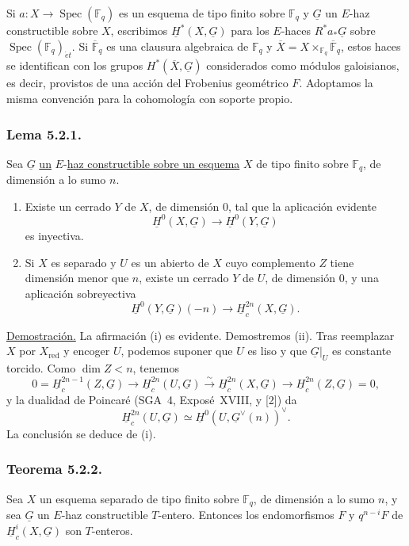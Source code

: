 \pageoriginale

Si $a:X\longrightarrow\operatorname{Spec}(\mathbb F_q)$ es un esquema
de tipo finito sobre $\mathbb F_q$ y $\underline G$ un $E$-haz
constructible sobre $X$, escribimos $\underline H^*(X,\underline G)$ para
los $E$-haces $R^*a_*\underline G$ sobre
$\operatorname{Spec}(\mathbb F_q)_{\acute e t}$. Si
$\overline{\mathbb F}_q$ es una clausura algebraica de $\mathbb F_q$ y
$\overline X=X\times_{\mathbb F_q}\overline{\mathbb F}_q$, estos haces se
identifican con los grupos $H^*(\overline X,\underline G)$ considerados
como módulos galoisianos, es decir, provistos de una acción del Frobenius
geométrico $F$. Adoptamos la misma convención para la cohomología con
soporte propio.

\subsubsection*{Lema 5.2.1.}
Sea $\underline G$ \underline{un} $E$-\underline{haz constructible sobre un esquema} $X$ de tipo
finito sobre $\mathbb F_q$, de dimensión a lo sumo $n$.
\begin{enumerate}[label=(\roman*)]
\item Existe un cerrado $Y$ de $X$, de dimensión $0$, tal que la
  aplicación evidente
  \[
  \underline H^0(X,\underline G)\longrightarrow
  \underline H^0(Y,\underline G)
  \]
  es inyectiva.
\item Si $X$ es separado y $U$ es un abierto de $X$ cuyo complemento $Z$
  tiene dimensión menor que $n$, existe un cerrado $Y$ de $U$, de
  dimensión $0$, y una aplicación sobreyectiva
  \[
  \underline H^0(Y,\underline G)(-n)\longrightarrow
  \underline H_c^{2n}(X,\underline G).
  \]
\end{enumerate}

\noindent\underline{Demostración.}
La afirmación (i) es evidente. Demostremos (ii). Tras reemplazar $X$ por
$X_{\mathrm{red}}$ y encoger $U$, podemos suponer que $U$ es liso y que
$\underline G|_U$ es constante torcido. Como $\dim Z<n$, tenemos
\[
0=\underline H_c^{2n-1}(Z,\underline G)
\longrightarrow\underline H_c^{2n}(U,\underline G)
\xrightarrow{\sim}\underline H_c^{2n}(X,\underline G)
\longrightarrow\underline H_c^{2n}(Z,\underline G)=0,
\]
y la dualidad de Poincaré (SGA~4, Exposé~XVIII, y [2]) da
\[
\underline H_c^{2n}(U,\underline G)\simeq
\underline H^0(U,\underline G^\vee(n))^\vee.
\]
La conclusión se deduce de (i).

\pageoriginale

\subsubsection*{Teorema 5.2.2.}
Sea $X$ un esquema separado de tipo finito sobre $\mathbb F_q$, de
dimensión a lo sumo $n$, y sea $\underline G$ un $E$-haz constructible
$T$-entero. Entonces los endomorfismos $F$ y $q^{n-i}F$ de
$\underline H_c^i(X,\underline G)$ son $T$-enteros.


